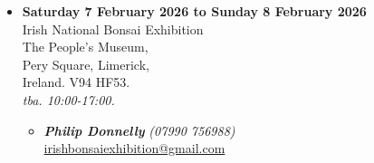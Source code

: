 \begin{itemize}
    \item \textbf{Saturday 7 February 2026 to Sunday 8 February 2026}
    \\
    Irish National Bonsai Exhibition \\
    The People's Museum, \\
    Pery Square, Limerick, \\
    Ireland. V94 HF53.
    \\
    \emph{tba. 10:00-17:00.}
    \begin{itemize}
        \item \textbf{\emph{Philip Donnelly}} \emph{(07990 756988)} \\
        \href{mailto:irishbonsaiexhibition@gmail.com}{irishbonsaiexhibition@gmail.com} 
    \end{itemize}


\end{itemize}
